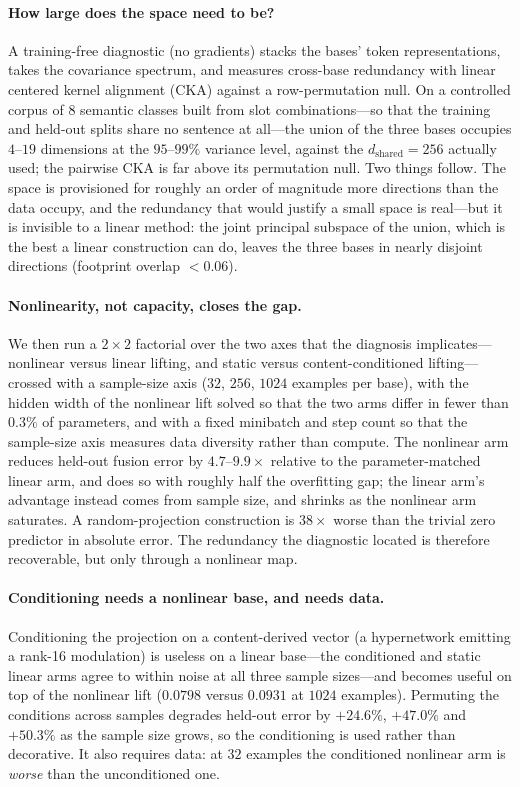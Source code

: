 \documentclass[10pt]{article}
\theoremstyle{definition}
\theoremstyle{plain}
\theoremstyle{remark}
\begin{document}
\paragraph{How large does the space need to be?}
A training-free diagnostic (no gradients) stacks the bases' token representations, takes the
covariance spectrum, and measures cross-base redundancy with linear centered kernel alignment
(CKA) against a row-permutation null. On a controlled corpus of $8$ semantic classes built from
slot combinations---so that the training and held-out splits share no sentence at all---the union of
the three bases occupies $4$--$19$ dimensions at the $95$--$99\%$ variance level, against the
$d_{\text{shared}}{=}256$ actually used; the pairwise CKA is far above its permutation null. Two
things follow. The space is provisioned for roughly an order of magnitude more directions than the
data occupy, and the redundancy that would justify a small space is real---but it is invisible to
a linear method: the joint principal subspace of the union, which is the best a linear
construction can do, leaves the three bases in nearly disjoint directions (footprint overlap
$<0.06$).

\paragraph{Nonlinearity, not capacity, closes the gap.}
We then run a $2\times2$ factorial over the two axes that the diagnosis implicates---nonlinear
versus linear lifting, and static versus content-conditioned lifting---crossed with a sample-size
axis ($32$, $256$, $1024$ examples per base), with the hidden width of the nonlinear lift solved
so that the two arms differ in fewer than $0.3\%$ of parameters, and with a fixed minibatch and
step count so that the sample-size axis measures data diversity rather than compute. The
nonlinear arm reduces held-out fusion error by $4.7$--$9.9\times$ relative to the
parameter-matched linear arm, and does so with roughly half the overfitting gap; the linear arm's
advantage instead comes from sample size, and shrinks as the nonlinear arm saturates. A
random-projection construction is $38\times$ worse than the trivial zero predictor in absolute
error. The redundancy the diagnostic located is therefore recoverable, but only through a nonlinear
map.

\paragraph{Conditioning needs a nonlinear base, and needs data.}
Conditioning the projection on a content-derived vector (a hypernetwork emitting a rank-16
modulation) is useless on a linear base---the conditioned and static linear arms agree to within
noise at all three sample sizes---and becomes useful on top of the nonlinear lift
($0.0798$ versus $0.0931$ at $1024$ examples). Permuting the conditions across samples
degrades held-out error by $+24.6\%$, $+47.0\%$ and $+50.3\%$ as the sample size grows, so the
conditioning is used rather than decorative. It also requires data: at $32$ examples the
conditioned nonlinear arm is \emph{worse} than the unconditioned one.
\end{document}
